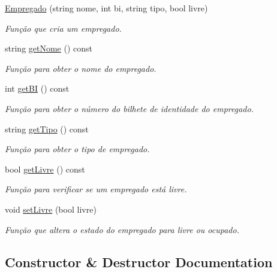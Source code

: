 \begin{DoxyCompactItemize}
\item 
\hyperlink{class_empregado_a41f417a80a0e7e83737c616beede3c7a}{Empregado} (string nome, int bi, string tipo, bool livre)
\begin{DoxyCompactList}\small\item\em Função que cria um empregado. \end{DoxyCompactList}\item 
string \hyperlink{class_empregado_a3b7e1e37085dc3233372303dc5fad063}{get\+Nome} () const 
\begin{DoxyCompactList}\small\item\em Função para obter o nome do empregado. \end{DoxyCompactList}\item 
int \hyperlink{class_empregado_af53f765432478ff43995d6373820a610}{get\+BI} () const 
\begin{DoxyCompactList}\small\item\em Função para obter o número do bilhete de identidade do empregado. \end{DoxyCompactList}\item 
string \hyperlink{class_empregado_a31668a30674046ed45b1543de5948b39}{get\+Tipo} () const 
\begin{DoxyCompactList}\small\item\em Função para obter o tipo de empregado. \end{DoxyCompactList}\item 
bool \hyperlink{class_empregado_a79d9a4467c7c506f26f178fe94f3084d}{get\+Livre} () const 
\begin{DoxyCompactList}\small\item\em Função para verificar se um empregado está livre. \end{DoxyCompactList}\item 
void \hyperlink{class_empregado_a81997099011c547e71bc52c5e69532d9}{set\+Livre} (bool livre)
\begin{DoxyCompactList}\small\item\em Função que altera o estado do empregado para livre ou ocupado. \end{DoxyCompactList}\end{DoxyCompactItemize}


\subsection{Constructor \& Destructor Documentation}
